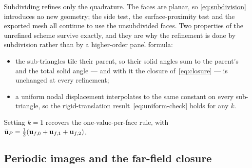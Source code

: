 Subdividing refines only the quadrature. The faces are planar, so
\eqref{eq:subdivision} introduces no new geometry; the side test, the
surface-proximity test and the exported mesh all continue to use the
unsubdivided faces. Two properties of the unrefined scheme survive exactly, and
they are why the refinement is done by subdivision rather than by a
higher-order panel formula:
\begin{itemize}
  \item the sub-triangles tile their parent, so their solid angles sum to the
        parent's and the total solid angle --- and with it the closure
        of~\eqref{eq:closure} --- is unchanged at every refinement;
  \item a uniform nodal displacement interpolates to the same constant on every
        sub-triangle, so the rigid-translation result~\eqref{eq:uniform-check}
        holds for any $k$.
\end{itemize}
Setting $k=1$ recovers the one-value-per-face rule, with
$\bar{\mathbf{u}}_P = \tfrac{1}{3}(\mathbf{u}_{f,0}+\mathbf{u}_{f,1}+\mathbf{u}_{f,2})$.

\subsection*{Periodic images and the far-field closure}

